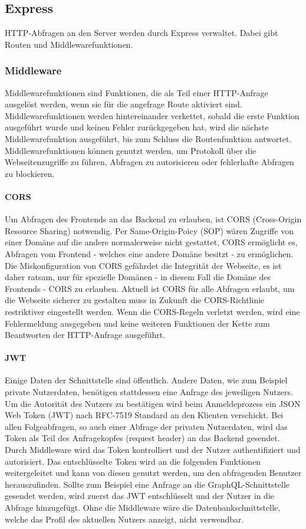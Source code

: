 \subsection{Express}
HTTP-Abfragen an den Server werden durch Express verwaltet. Dabei gibt Routen und Middlewarefunktionen.

\subsubsection{Middleware}
Middlewarefunktionen sind Funktionen, die als Teil einer HTTP-Anfrage ausgelöst werden, wenn sie für die angefrage Route aktiviert sind. Middlewarefunktionen werden hintereinander verkettet, sobald die erste Funktion ausgeführt wurde und keinen Fehler zurückgegeben hat, wird die nächste Middlewarefunktion ausgeführt, bis zum Schluss die Routenfunktion antwortet. Middlewarefunktionen können genutzt werden, um Protokoll über die Webseitenzugriffe zu führen, Abfragen zu autorisieren oder fehlerhafte Abfragen zu blockieren.

\paragraph{CORS\\}
Um Abfragen des Frontends an das Backend zu erlauben, ist CORS (Cross-Origin Resource Sharing) notwendig. Per Same-Origin-Poicy (SOP) wären Zugriffe von einer Domäne auf die andere normalerweise nicht gestattet, CORS ermöglicht es, Abfragen vom Frontend - welches eine andere Domäne besitzt - zu ermöglichen. Die Miskonfiguration von CORS gefährdet die Integrität der Webseite, es ist daher ratsam, nur für spezielle Domänen - in diesem Fall die Domäne des Frontends - CORS zu erlauben. Aktuell ist CORS für alle Abfragen erlaubt, um die Webseite sicherer zu gestalten muss in Zukunft die CORS-Richtlinie restriktiver eingestellt werden. Wenn die CORS-Regeln verletzt werden, wird eine Fehlermeldung ausgegeben und keine weiteren Funktionen der Kette zum Beantworten der HTTP-Anfrage ausgeführt.

\paragraph{JWT\\}
Einige Daten der Schnittstelle sind öffentlich. Andere Daten, wie zum Beispiel private Nutzerdaten, benötigen stattdessen eine Anfrage des jeweiligen Nutzers. Um die Autorität des Nutzers zu bestätigen wird beim Anmeldeprozess ein JSON Web Token (JWT) nach RFC-7519 Standard an den Klienten verschickt\cite{RFC7519}. Bei allen Folgeabfragen, so auch einer Abfrage der privaten Nutzerdaten, wird das Token als Teil des Anfragekopfes (request header) an das Backend gesendet. Durch Middleware wird das Token kontrolliert und der Nutzer authentifiziert und autorisiert. Das entschlüsselte Token wird an die folgenden Funktionen weitergeleitet und kann von diesen genutzt werden, um den abfragenden Benutzer herauszufinden. Sollte zum Beispiel eine Anfrage an die GraphQL-Schnittstelle gesendet werden, wird zuerst das JWT entschlüsselt und der Nutzer in die Abfrage hinzugefügt. Ohne die Middleware wäre die Datenbankschnittstelle, welche das Profil des aktuellen Nutzers anzeigt, nicht verwendbar.

